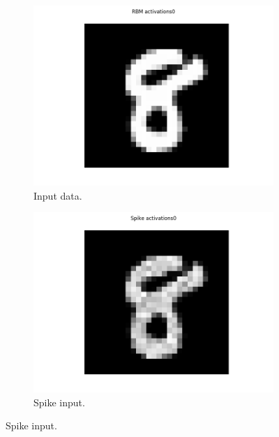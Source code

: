 \begin{figure}
	\centering
	\begin{subfigure}[t]{.32\textwidth}
  		\centering
  		\includegraphics[width=.9\linewidth]{imgs/convert/rbm00000.png}
  		\caption{Input data.}
  		\label{fig:sub1}
	\end{subfigure}%
	\begin{subfigure}[t]{.32\textwidth}
  		\centering
  		\includegraphics[width=.9\linewidth]{imgs/convert/cnn00000.png}
  		\caption{Spike input.}
  		\label{fig:sub2}
	\end{subfigure}
	

\end{figure}
